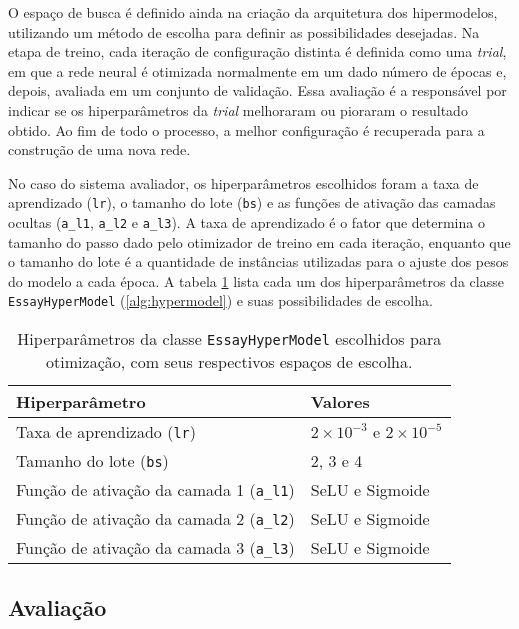 O espaço de busca é definido ainda na criação da arquitetura dos hipermodelos, utilizando um método de escolha para definir as possibilidades desejadas. Na etapa de treino, cada iteração de configuração distinta é definida como uma \textit{trial}, em que a rede neural é otimizada normalmente em um dado número de épocas e, depois, avaliada em um conjunto de validação. Essa avaliação é a responsável por indicar se os hiperparâmetros da \textit{trial} melhoraram ou pioraram o resultado obtido. Ao fim de todo o processo, a melhor configuração é recuperada para a construção de uma nova rede.

No caso do sistema avaliador, os hiperparâmetros escolhidos foram a taxa de aprendizado (\texttt{lr}), o tamanho do lote (\texttt{bs}) e as funções de ativação das camadas ocultas (\texttt{a\_l1}, \texttt{a\_l2} e \texttt{a\_l3}). A taxa de aprendizado é o fator que determina o tamanho do passo dado pelo otimizador de treino em cada iteração, enquanto que o tamanho do lote é a quantidade de instâncias utilizadas para o ajuste dos pesos do modelo a cada época. A tabela \ref{tab:hyperparameters-to-tune} lista cada um dos hiperparâmetros da classe \texttt{EssayHyperModel} (\autoref{alg:hypermodel}) e suas possibilidades de escolha.

\begin{table}[H]
    \centering
    \caption{Hiperparâmetros da classe \texttt{EssayHyperModel} escolhidos para otimização, com seus respectivos espaços de escolha.}
    \label{tab:hyperparameters-to-tune}
    \begin{tabular}{ll}
        \toprule
        \textbf{Hiperparâmetro} & \textbf{Valores} \\
        \midrule
        Taxa de aprendizado (\texttt{lr}) & $2 \times 10^{-3}$ e $2 \times 10^{-5}$ \\
        Tamanho do lote (\texttt{bs}) & 2, 3 e 4 \\
        Função de ativação da camada 1 (\texttt{a\_l1}) & SeLU e Sigmoide \\
        Função de ativação da camada 2 (\texttt{a\_l2}) & SeLU e Sigmoide \\
        Função de ativação da camada 3 (\texttt{a\_l3}) & SeLU e Sigmoide \\
        \bottomrule
    \end{tabular}
\end{table}


\subsection{Avaliação}
\label{subsec:methodology-evaluation}

